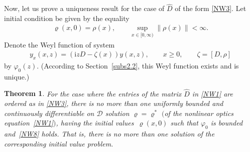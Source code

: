 \documentclass[pdftex]{sigma}
\newtheorem{Theorem}{Theorem}[section]
\def\vr{\varrho}
\def\vp{\varphi}
\def\wh{\widehat}
\newcommand{\I}{\mathrm{i}}
\newcommand{\cD}{{\mathcal D}}
\numberwithin{equation}{section}
\begin{document}
Now, let us prove a uniqueness result for the case of $\wh D$ of the form \eqref{NW3}.
Let initial condition be given by the equality
\begin{gather*} %
\vr(x,0)= \rho(x), \qquad \sup_{x\in [0,\infty)} \|\rho(x)\|<\infty.
\end{gather*}
Denote the Weyl function of system
\begin{gather} \label{NW37}
y_x(x,z)=(\I z D-\zeta(x))y(x,z), \qquad x \geq 0 , \qquad \zeta=[D, \rho]
\end{gather}
by $\vp_0(z)$. (According to Section~\ref{subs2.2}, this Weyl function exists and is unique.)
\begin{Theorem}\label{TmNWnm}
For the case where the entries of the matrix $\wh D$ in \eqref{NW1} are ordered as in \eqref{NW3},
there is no more than one uniformly bounded and continuously
differentiable on $\cD$ solution $\vr=\vr^*$ $($of the nonlinear optics equation~\eqref{NW1}$)$,
having
the initial values~$\vr(x,0)$ such
that
$\vp_0$ is bounded and~\eqref{NW8} holds. That is, there is no more than one
solution of the corresponding initial value problem.
\end{Theorem}
\end{document}
